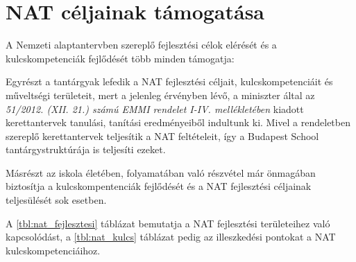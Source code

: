 \section{NAT céljainak támogatása}
\label{sec:nat_celjai}
A Nemzeti alaptantervben szereplő fejlesztési célok elérését és a
kulcskompetenciák fejlődését több minden támogatja:

Egyrészt a tantárgyak lefedik a NAT fejlesztési céljait, kulcskompetenciáit és
műveltségi területeit, mert a jelenleg érvényben lévő, a miniszter által az
\emph{51/2012. (XII. 21.) számú EMMI rendelet I-IV. mellékletében} kiadott
kerettantervek \citep{ofi:kerettanterv} tanulási, tanítási eredményeiből
indultunk ki. Mivel a rendeletben szereplő kerettantervek teljesítik a NAT
feltételeit, így a Budapest School tantárgystruktúrája is teljesíti ezeket.

Másrészt az iskola életében, folyamatában való részvétel már önmagában
biztosítja a kulcskompentenciák fejlődését és a NAT fejlesztési céljainak
teljesülését sok esetben.

A \ref{tbl:nat_fejlesztesi} táblázat bemutatja a NAT fejlesztési területeihez
való kapcsolódást, a
\ref{tbl:nat_kulcs} táblázat pedig az illeszkedési pontokat a NAT
kulcskompetenciáihoz.

